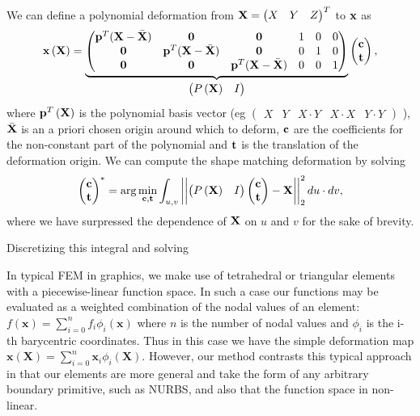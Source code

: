 We can define a polynomial deformation from $\mathbf{X} = \begin{pmatrix} X & Y & Z \end{pmatrix}^T$ to $\mathbf{x}$  as 
\begin{equation}
    \mathbf{x}\left(\mathbf{X}\right) = 
    \underbrace{\begin{pmatrix}
    \mathbf{p}^T(\mathbf{X}-\bar{\mathbf{X}}) & \mathbf{0} & \mathbf{0} & 1 & 0 & 0\\
    \mathbf{0} & \mathbf{p}^T(\mathbf{X}-\bar{\mathbf{X}}) & \mathbf{0} & 0 & 1 & 0\\
    \mathbf{0} & \mathbf{0} & \mathbf{p}^T(\mathbf{X}-\bar{\mathbf{X}}) & 0 & 0 & 1\\
    \end{pmatrix}}_{\begin{pmatrix}P\left(\mathbf{X}\right) & I \end{pmatrix}}
    \begin{pmatrix} \mathbf{c}\\ \mathbf{t} \end{pmatrix},
\end{equation} where $\mathbf{p}^T\left(\mathbf{X}\right)$ is the polynomial basis vector \newline (eg $\begin{pmatrix} X & Y & X\cdot Y & X\cdot X & Y\cdot Y \end{pmatrix}$ ),
$\bar{\mathbf{X}}$ is an a priori chosen origin around which to deform, $\mathbf{c}$ are the coefficients for the 
non-constant part of the polynomial and $\mathbf{t}$ is the translation of the deformation origin. 
We can compute the shape matching deformation by solving
\begin{equation}
    \begin{pmatrix} 
        \mathbf{c}\\
        \mathbf{t}
    \end{pmatrix}^* = \arg\min_{\mathbf{c},\mathbf{t}} \int_{u,v} \left\lvert\left\lvert\begin{pmatrix}P\left(\mathbf{X}\right) & I \end{pmatrix}\begin{pmatrix} \mathbf{c}\\ \mathbf{t} \end{pmatrix} - \mathbf{X}\right\rvert\right\rvert^2_2 du\cdot dv,
\end{equation} where we have surpressed the dependence of $\mathbf{X}$ on $u$ and $v$ for the sake of brevity.

Discretizing this integral and solving 




In typical FEM in graphics, we make use of tetrahedral or triangular elements with a piecewise-linear function space. In such a case our functions may be evaluated as a weighted combination of the nodal values of an element: $f(\mathbf x)=\sum_{i=0}^n f_i \phi_i(\mathbf{x})$ where $n$ is the number of nodal values and $\phi_i$ is the i-th barycentric coordinates. Thus in this case we have the simple deformation map $\mathbf{x(X)} = \sum_{i=0}^n \mathbf{x}_i \phi_i(\mathbf{X})$. However, our method contrasts this typical approach in that our elements are more general and take the form of any arbitrary boundary primitive, such as NURBS, and also that the function space in non-linear. 

